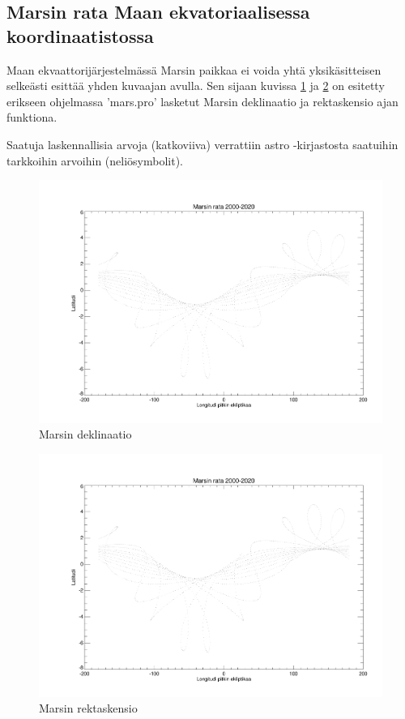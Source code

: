 \documentclass[12pt, a4paper]{article}
\begin{document}
\newpage
\subsection[Ekvaattorirata]{Marsin rata Maan ekvatoriaalisessa koordinaatistossa}\label{Ekvaattori}
Maan ekvaattorijärjestelmässä Marsin paikkaa ei voida yhtä yksikäsitteisen selkeästi esittää yhden kuvaajan avulla. Sen sijaan kuvissa \ref{Kuva2} ja \ref{Kuva3} on esitetty erikseen ohjelmassa 'mars.pro' lasketut Marsin deklinaatio ja rektaskensio ajan funktiona.

Saatuja laskennallisia arvoja (katkoviiva) verrattiin astro -kirjastosta saatuihin tarkkoihin arvoihin (neliösymbolit).

\begin{figure}[H]
\centerline{\includegraphics[page=2,angle=0,width=0.8\paperwidth]{mars.pdf}}
\caption{Marsin deklinaatio}
\label{Kuva2}
\end{figure}

\begin{figure}[H]
\vspace*{-3cm}\centerline{\includegraphics[page=3,angle=0,width=0.8\paperwidth]{mars.pdf}}
\caption{Marsin rektaskensio}
\label{Kuva3}
\end{figure}
\vspace*{1cm}
\end{document}
